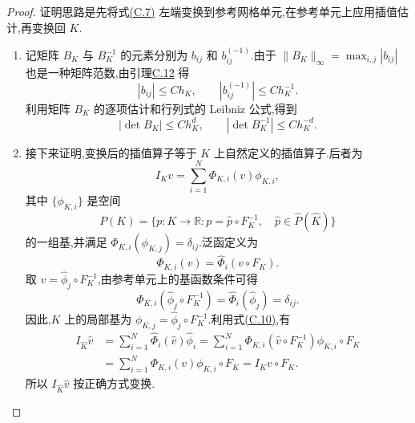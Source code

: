 \begin{proof}
证明思路是先将式\hyperref[eq:appendix-c-7]{(C.7)} 左端变换到参考网格单元,在参考单元上应用插值估计,再变换回 $K$.

\begin{enumerate}[label=(\roman*)]
\item 记矩阵 $B_K$ 与 $B_K^{-1}$ 的元素分别为 $b_{ij}$ 和 $b_{ij}^{(-1)}$.由于
$\|B_K\|_\infty=\max_{i,j}|b_{ij}|$ 也是一种矩阵范数,由引理\hyperref[lem:appendix-c-12]{C.12} 得
\begin{equation}\label{eq:appendix-c-8}
 |b_{ij}|\le Ch_K,\qquad
 |b_{ij}^{(-1)}|\le Ch_K^{-1}.
\end{equation}
利用矩阵 $B_K$ 的逐项估计和行列式的 Leibniz 公式,得到
\begin{equation}\label{eq:appendix-c-9}
 |\det B_K|\le Ch_K^d,\qquad
 |\det B_K^{-1}|\le Ch_K^{-d}.
\end{equation}

\item 接下来证明,变换后的插值算子等于 $K$ 上自然定义的插值算子.后者为
\begin{equation}\label{eq:appendix-c-10}
 I_Kv=\sum_{i=1}^N\Phi_{K,i}(v)\phi_{K,i},
\end{equation}
其中 $\{\phi_{K,i}\}$ 是空间
\[
 P(K)=\{p:K\to\mathbb R:p=\widehat p\circ F_K^{-1},\quad
 \widehat p\in\widehat P(\widehat K)\}
\]
的一组基,并满足 $\Phi_{K,i}(\phi_{K,j})=\delta_{ij}$.泛函定义为
\[
 \Phi_{K,i}(v)=\widehat\Phi_i(v\circ F_K).
\]
取 $v=\widehat\phi_j\circ F_K^{-1}$,由参考单元上的基函数条件可得
\[
 \Phi_{K,i}(\widehat\phi_j\circ F_K^{-1})
 =\widehat\Phi_i(\widehat\phi_j)=\delta_{ij}.
\]
因此,$K$ 上的局部基为 $\phi_{K,j}=\widehat\phi_j\circ F_K^{-1}$.利用式\hyperref[eq:appendix-c-10]{(C.10)},有
\[
\begin{aligned}
 I_{\widehat K}\widehat v
 &=\sum_{i=1}^N\widehat\Phi_i(\widehat v)\widehat\phi_i
 =\sum_{i=1}^N\Phi_{K,i}(\widehat v\circ F_K^{-1})
    \phi_{K,i}\circ F_K\\
 &=\sum_{i=1}^N\Phi_{K,i}(v)\phi_{K,i}\circ F_K
 =I_Kv\circ F_K.
\end{aligned}
\]
所以 $I_{\widehat K}\widehat v$ 按正确方式变换.


\end{enumerate}
\end{proof}
